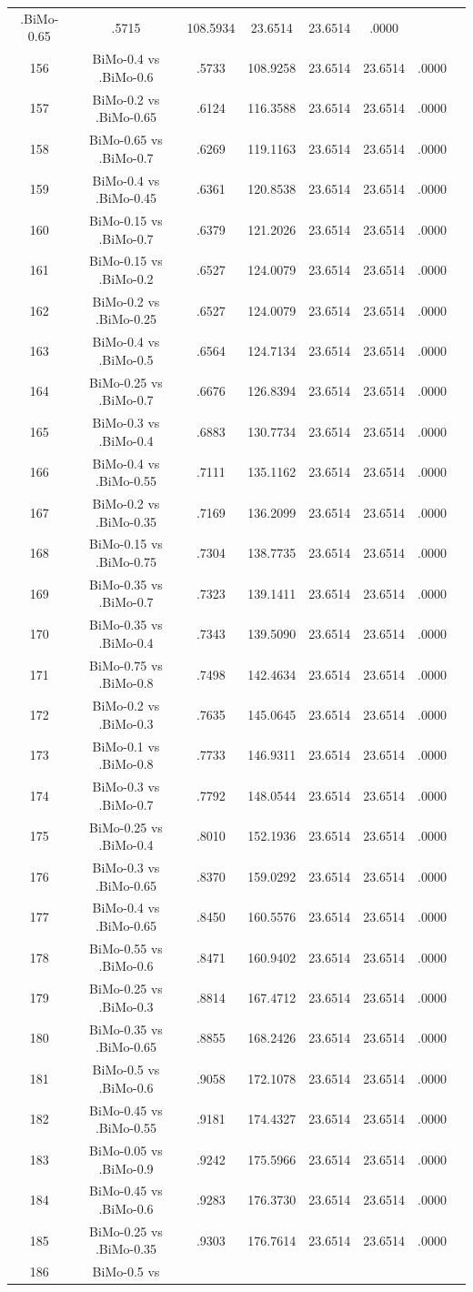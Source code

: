 \documentclass[a4paper,10pt]{article}
\begin{document}
\begin{landscape}
\begin{table}[!htp]
\begin{tabular}{cccccccc}
.BiMo-0.65&.5715&108.5934&23.6514&23.6514&.0000\\156&BiMo-0.4 vs .BiMo-0.6&.5733&108.9258&23.6514&23.6514&.0000\\157&BiMo-0.2 vs .BiMo-0.65&.6124&116.3588&23.6514&23.6514&.0000\\158&BiMo-0.65 vs .BiMo-0.7&.6269&119.1163&23.6514&23.6514&.0000\\159&BiMo-0.4 vs .BiMo-0.45&.6361&120.8538&23.6514&23.6514&.0000\\160&BiMo-0.15 vs .BiMo-0.7&.6379&121.2026&23.6514&23.6514&.0000\\161&BiMo-0.15 vs .BiMo-0.2&.6527&124.0079&23.6514&23.6514&.0000\\162&BiMo-0.2 vs .BiMo-0.25&.6527&124.0079&23.6514&23.6514&.0000\\163&BiMo-0.4 vs .BiMo-0.5&.6564&124.7134&23.6514&23.6514&.0000\\164&BiMo-0.25 vs .BiMo-0.7&.6676&126.8394&23.6514&23.6514&.0000\\165&BiMo-0.3 vs .BiMo-0.4&.6883&130.7734&23.6514&23.6514&.0000\\166&BiMo-0.4 vs .BiMo-0.55&.7111&135.1162&23.6514&23.6514&.0000\\167&BiMo-0.2 vs .BiMo-0.35&.7169&136.2099&23.6514&23.6514&.0000\\168&BiMo-0.15 vs .BiMo-0.75&.7304&138.7735&23.6514&23.6514&.0000\\169&BiMo-0.35 vs .BiMo-0.7&.7323&139.1411&23.6514&23.6514&.0000\\170&BiMo-0.35 vs .BiMo-0.4&.7343&139.5090&23.6514&23.6514&.0000\\171&BiMo-0.75 vs .BiMo-0.8&.7498&142.4634&23.6514&23.6514&.0000\\172&BiMo-0.2 vs .BiMo-0.3&.7635&145.0645&23.6514&23.6514&.0000\\173&BiMo-0.1 vs .BiMo-0.8&.7733&146.9311&23.6514&23.6514&.0000\\174&BiMo-0.3 vs .BiMo-0.7&.7792&148.0544&23.6514&23.6514&.0000\\175&BiMo-0.25 vs .BiMo-0.4&.8010&152.1936&23.6514&23.6514&.0000\\176&BiMo-0.3 vs .BiMo-0.65&.8370&159.0292&23.6514&23.6514&.0000\\177&BiMo-0.4 vs .BiMo-0.65&.8450&160.5576&23.6514&23.6514&.0000\\178&BiMo-0.55 vs .BiMo-0.6&.8471&160.9402&23.6514&23.6514&.0000\\179&BiMo-0.25 vs .BiMo-0.3&.8814&167.4712&23.6514&23.6514&.0000\\180&BiMo-0.35 vs .BiMo-0.65&.8855&168.2426&23.6514&23.6514&.0000\\181&BiMo-0.5 vs .BiMo-0.6&.9058&172.1078&23.6514&23.6514&.0000\\182&BiMo-0.45 vs .BiMo-0.55&.9181&174.4327&23.6514&23.6514&.0000\\183&BiMo-0.05 vs .BiMo-0.9&.9242&175.5966&23.6514&23.6514&.0000\\184&BiMo-0.45 vs .BiMo-0.6&.9283&176.3730&23.6514&23.6514&.0000\\185&BiMo-0.25 vs .BiMo-0.35&.9303&176.7614&23.6514&23.6514&.0000\\186&BiMo-0.5 vs 
\end{tabular}
\end{table}
\end{landscape}
\end{document}
